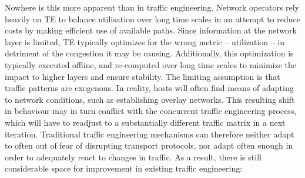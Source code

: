Nowhere is this more apparent than in traffic engineering. 
Network operators rely heavily on \ac{TE} to balance utilisation over long time scales in an attempt to reduce costs by making efficient use of available paths. 
Since information at the network layer is limited, \ac{TE} typically optimizes for the wrong metric -- utilization -- in detriment of the congestion it may be causing. 
Additionally, this optimization is typically executed offline, and re-computed over long time scales to minimize the impact to higher layers and ensure stability. 
The limiting assumption is that traffic patterns are exogenous. 
In reality, hosts will often find means of adapting to network conditions, such as establishing overlay networks. 
This resulting shift in behaviour may in turn conflict with the concurrent traffic engineering process, which will have to readjust to a substantially different traffic matrix in a next iteration. 
Traditional traffic engineering mechanisms can therefore neither adapt to often out of fear of disrupting transport protocols, nor adapt often enough in order to adequately react to changes in traffic.
As a result, there is still considerable space for improvement in existing traffic engineering:

